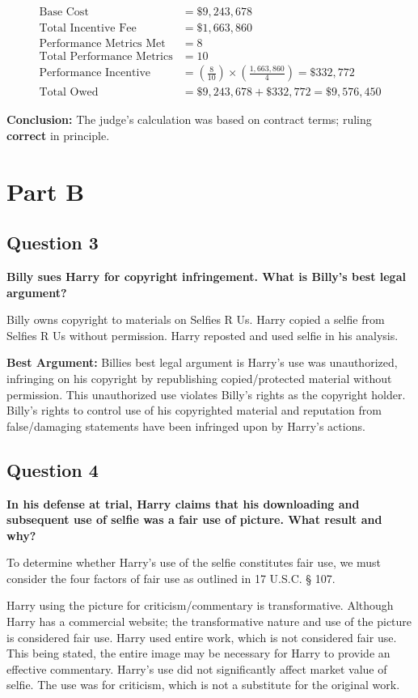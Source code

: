 \documentclass[12pt]{article}
\begin{document}
\begin{align*}
\text{Base Cost} &= \$9,243,678 \\
\text{Total Incentive Fee} &= \$1,663,860 \\
\text{Performance Metrics Met} &= 8 \\
\text{Total Performance Metrics} &= 10 \\
\text{Performance Incentive} &= \left(\frac{8}{10}\right) \times \left(\frac{1,663,860}{4}\right) = \$332,772 \\
\text{Total Owed} &= \$9,243,678 + \$332,772 = \$9,576,450
\end{align*}

\textbf{Conclusion:} The judge's calculation was based on contract terms; ruling \textbf{correct} in principle.

\section*{Part B}

\subsection*{Question 3}
\textbf{Billy sues Harry for copyright infringement. What is Billy’s best legal argument?}


Billy owns copyright to materials on Selfies R Us.
Harry copied a selfie from Selfies R Us without permission.
Harry reposted and used selfie in his analysis.

\textbf{Best Argument:} Billies best legal argument is Harry's use was unauthorized, infringing on his copyright by republishing copied/protected material without permission. This unauthorized use violates Billy’s rights as the copyright holder. Billy’s rights to control use of his copyrighted material and reputation from false/damaging statements have been infringed upon by Harry’s actions.

\subsection*{Question 4}
\textbf{In his defense at trial, Harry claims that his downloading and subsequent use of selfie was a fair use of picture. What result and why?}

To determine whether Harry’s use of the selfie constitutes fair use, we must consider the four factors of fair use as outlined in 17 U.S.C. § 107.

Harry using the picture for criticism/commentary is transformative.
Although Harry has a commercial website; the transformative nature and use of the picture is considered fair use.
Harry used entire work, which is not considered fair use. This being stated, the entire image may be necessary for Harry to provide an effective commentary.
Harry's use did not significantly affect market value of selfie. The use was for criticism, which is not a substitute for the original work. 
\end{document}
